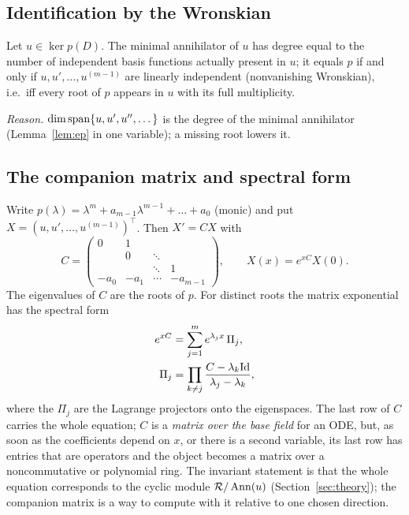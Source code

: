 \subsection{Identification by the Wronskian}
\begin{proposition}
Let $u\in\ker p(D)$. The minimal annihilator of $u$ has degree equal to the number of independent basis functions actually present in $u$; it equals $p$ if and only if $u,u',\dots,u^{(m-1)}$ are linearly independent (nonvanishing Wronskian), i.e.\ iff every root of $p$ appears in $u$ with its full multiplicity.
\end{proposition}
\emph{Reason.} $\operatorname{dim}\operatorname{span}\{u,u',u'',\dots\}$ is the degree of the minimal annihilator (Lemma~\ref{lem:ep} in one variable); a missing root lowers it.

\subsection{The companion matrix and spectral form}
Write $p(\lambda)=\lambda^m+a_{m-1}\lambda^{m-1}+\dots+a_0$ (monic) and put $X=(u,u',\dots,u^{(m-1)})^{\top}$. Then $X'=CX$ with
\[
C=\begin{pmatrix}0&1&&\\&0&\ddots&\\&&\ddots&1\\-a_0&-a_1&\cdots&-a_{m-1}\end{pmatrix},\qquad
X(x)=e^{xC}X(0).
\]
The eigenvalues of $C$ are the roots of $p$. For distinct roots the matrix exponential has the spectral form
\begin{equation}\label{eq:spectral}
\begin{aligned}
e^{xC}&=\sum_{j=1}^me^{\lambda_jx}\,\Pi_j,\\
\Pi_j&=\prod_{k\ne j}\frac{C-\lambda_k\mathrm{Id}}{\lambda_j-\lambda_k},
\end{aligned}
\end{equation}
where the $\Pi_j$ are the Lagrange projectors onto the eigenspaces. The last row of $C$ carries the whole equation; $C$ is a \emph{matrix over the base field} for an ODE, but, as soon as the coefficients depend on $x$, or there is a second variable, its last row has entries that are operators and the object becomes a matrix over a noncommutative or polynomial ring. The invariant statement is that the whole equation corresponds to the cyclic module $\mathcal{R}/\operatorname{Ann}(u)$ (Section~\ref{sec:theory}); the companion matrix is a way to compute with it relative to one chosen direction.

